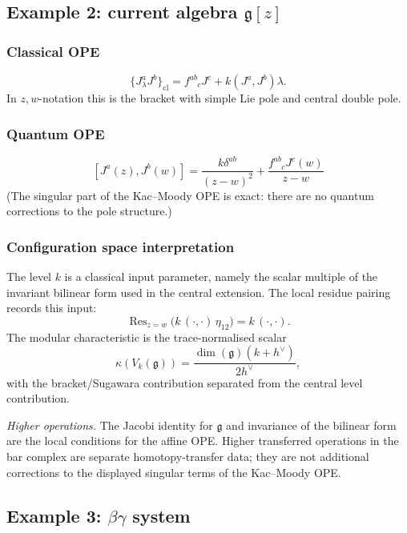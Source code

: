 \subsection{\texorpdfstring{Example 2: current algebra $\mathfrak{g}[z]$}{Example 2: current algebra g[z]}}

\subsubsection{Classical OPE}

\[
\{J^a_\lambda J^b\}_{\mathrm{cl}}
= f^{ab}_{\phantom{ab}c}J^c+k(J^a,J^b)\lambda .
\]
In \(z,w\)-notation this is the bracket with simple Lie pole and
central double pole.

\subsubsection{Quantum OPE}

\[[J^a(z), J^b(w)] = \frac{k \delta^{ab}}{(z-w)^2} + \frac{f^{ab}_{\phantom{ab}c} J^c(w)}{z-w}\]
(The singular part of the Kac--Moody OPE is exact: there are no quantum corrections to the pole structure.)

\subsubsection{Configuration space interpretation}

The level $k$ is a classical input parameter, namely the scalar
multiple of the invariant bilinear form used in the central extension.
The local residue pairing records this input:
\[
\operatorname{Res}_{z=w}\bigl(k\,(\cdot,\cdot)\,\eta_{12}\bigr)=
k\,(\cdot,\cdot).
\]
The modular characteristic is the trace-normalised scalar
\[
\kappa(V_k(\mathfrak g))
=\frac{\dim(\mathfrak g)(k+h^\vee)}{2h^\vee},
\]
with the bracket/Sugawara contribution separated from the central
level contribution.

\emph{Higher operations.}
The Jacobi identity for $\mathfrak g$ and invariance of the bilinear
form are the local conditions for the affine OPE. Higher transferred
operations in the bar complex are separate homotopy-transfer data; they
are not additional corrections to the displayed singular terms of the
Kac--Moody OPE.

\subsection{\texorpdfstring{Example 3: $\beta\gamma$ system}{Example 3: system}}

